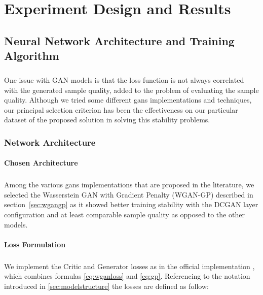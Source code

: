 \chapter{Experiment Design and Results}
\label{ch:experiment}

\paragraph{}

 
\section{Neural Network Architecture and Training Algorithm}
\label{sec:nn}
\paragraph{} One issue with GAN models is that the loss function is not always correlated with the generated sample quality, added to the problem of evaluating the sample quality. Although we tried some different \glspl{gan} implementations and techniques, our principal selection criterion has been the effectiveness on our particular dataset of the proposed solution in solving this stability problems.

\subsection{Network Architecture}
\label{sec:networkarch}

\subsubsection{Chosen Architecture} 
\paragraph{} Among the various \glspl{gan} implementations that are proposed in the literature, we selected the Wasserstein GAN with Gradient Penalty \cite{wgangp} (WGAN-GP) described in section~\ref{sec:wgangp} as it showed better training stability with the DCGAN layer configuration and at least comparable sample quality as opposed to the other models.


\subsubsection{Loss Formulation}
\paragraph{} We implement the Critic and Generator losses as in the  official implementation \cite{wgangp-imple}, which combines formulas \ref{eq:wganloss} and \ref{eq:gp}. Referencing to the notation introduced in \ref{sec:modelstructure} the losses are defined as follow:

